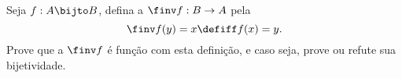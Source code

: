 \begin{exercise}
%
Seja $f : A \bijto B$, defina a  $\finv f : B \to A$ pela
$$
\finv f (y) = x \defiff f(x) = y.
$$
Prove que a $\finv f$ é função com esta definição, e caso seja, prove ou refute sua bijetividade.
\end{exercise}

